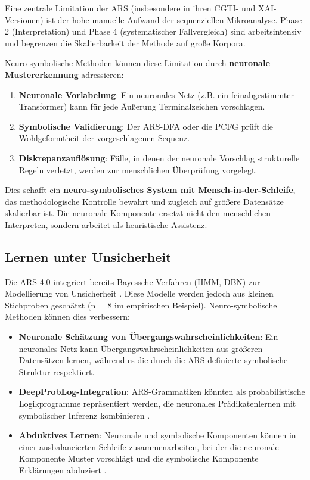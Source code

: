 \documentclass[12pt,a4paper]{article}
\begin{document}
Eine zentrale Limitation der ARS (insbesondere in ihren CGTI- und XAI-Versionen) 
ist der hohe manuelle Aufwand der sequenziellen Mikroanalyse. Phase 2 (Interpretation) 
und Phase 4 (systematischer Fallvergleich) sind arbeitsintensiv und begrenzen die 
Skalierbarkeit der Methode auf große Korpora.

Neuro-symbolische Methoden können diese Limitation durch \textbf{neuronale 
Mustererkennung} adressieren:

\begin{enumerate}
    \item \textbf{Neuronale Vorlabelung}: Ein neuronales Netz (z.B. ein feinabgestimmter 
    Transformer) kann für jede Äußerung Terminalzeichen vorschlagen.
    \item \textbf{Symbolische Validierung}: Der ARS-DFA oder die PCFG prüft die 
    Wohlgeformtheit der vorgeschlagenen Sequenz.
    \item \textbf{Diskrepanzauflösung}: Fälle, in denen der neuronale Vorschlag 
    strukturelle Regeln verletzt, werden zur menschlichen Überprüfung vorgelegt.
\end{enumerate}

Dies schafft ein \textbf{neuro-symbolisches System mit Mensch-in-der-Schleife}, 
das methodologische Kontrolle bewahrt und zugleich auf größere Datensätze skalierbar 
ist. Die neuronale Komponente ersetzt nicht den menschlichen Interpreten, sondern 
arbeitet als heuristische Assistenz.

\subsection{Lernen unter Unsicherheit}

Die ARS 4.0 integriert bereits Bayessche Verfahren (HMM, DBN) zur Modellierung 
von Unsicherheit \citep{koop2024bayes}. Diese Modelle werden jedoch aus kleinen 
Stichproben geschätzt (n = 8 im empirischen Beispiel). Neuro-symbolische Methoden 
können dies verbessern:

\begin{itemize}
    \item \textbf{Neuronale Schätzung von Übergangswahrscheinlichkeiten}: Ein 
    neuronales Netz kann Übergangswahrscheinlichkeiten aus größeren Datensätzen 
    lernen, während es die durch die ARS definierte symbolische Struktur respektiert.
    
    \item \textbf{DeepProbLog-Integration}: ARS-Grammatiken könnten als probabilistische 
    Logikprogramme repräsentiert werden, die neuronales Prädikatenlernen mit 
    symbolischer Inferenz kombinieren \citep{manhaeve2018deepproblog}.
    
    \item \textbf{Abduktives Lernen}: Neuronale und symbolische Komponenten können 
    in einer ausbalancierten Schleife zusammenarbeiten, bei der die neuronale 
    Komponente Muster vorschlägt und die symbolische Komponente Erklärungen abduziert 
    \citep{zhou2022abductive}.
\end{itemize}
\end{document}
